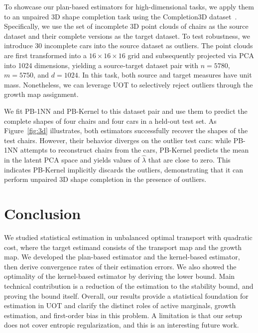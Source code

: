 \documentclass[11pt,reqno]{amsart}
\theoremstyle{definition}
\renewcommand{\hat}{\widehat}
\begin{document}
To showcase our plan-based estimators for high-dimensional tasks, we apply them to an unpaired 3D shape completion task using the Completion3D dataset~\cite{Chang2015,Yuan2018}. Specifically, we use the set of incomplete 3D point clouds of chairs as the source dataset and their complete versions as the target dataset. To test robustness, we introduce 30 incomplete cars into the source dataset as outliers. The point clouds are first transformed into a $16\times 16\times 16$ grid and subsequently projected via PCA into 1024 dimensions, yielding a source-target dataset pair with $n=5780$, $m=5750$, and $d=1024$. In this task, both source and target measures have unit mass. Nonetheless, we can leverage UOT to selectively reject outliers through the growth map assignment.

We fit PB-1NN and PB-Kernel to this dataset pair and use them to predict the complete shapes of four chairs and four cars in a held-out test set. As Figure~\ref{fig:3d} illustrates, both estimators successfully recover the shapes of the test chairs. However, their behavior diverges on the outlier test cars: while PB-1NN attempts to reconstruct chairs from the cars, PB-Kernel predicts the mean in the latent PCA space and yields values of $\hat\lambda$ that are close to zero. This indicates PB-Kernel implicitly discards the outliers, demonstrating that it can perform unpaired 3D shape completion in the presence of outliers.


\section{Conclusion}
We studied statistical estimation in unbalanced optimal transport with quadratic cost, where the target estimand consists of the transport map and the growth map. We developed the plan-based estimator and the kernel-based estimator, then derive convergence rates of their estimation errors. We also showed the optimality of the kernel-based estimator by deriving the lower bound. Main technical contribution is a reduction of the estimation to the stability bound, and proving the bound itself. Overall, our results provide a statistical foundation for estimation in UOT and clarify the distinct roles of active marginals, growth estimation, and first-order bias in this problem. 
A limitation is that our setup does not cover entropic regularization, and this is an interesting future work.




\newpage

\appendix
\end{document}
